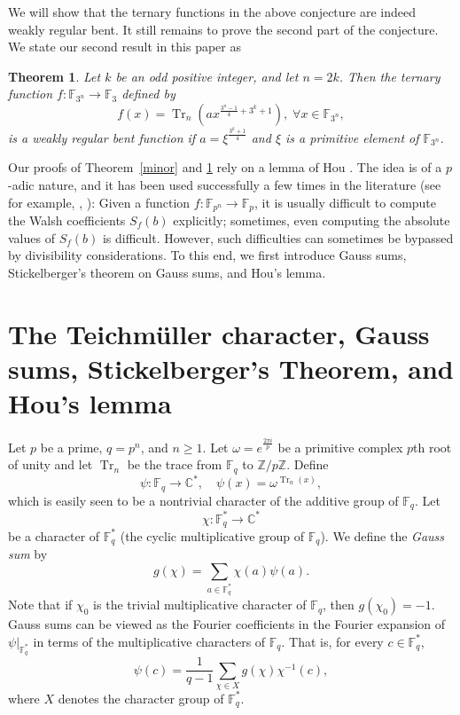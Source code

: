 \documentclass[11pt, reqno]{amsart}
\newtheorem{teor}{Theorem}[section]
\newcommand{\Ff}{{\mathbb F}}
\newcommand{\Zz}{{\mathbb Z}}
\newcommand{\Cc}{{\mathbb C}}
\def\Tr{\operatorname{Tr}}
\def\Tr{\operatorname{Tr}}
\begin{document}
We will show that the ternary functions in the above conjecture are
indeed weakly regular bent. It still remains to prove the second
part of the conjecture. We state our second result in this paper as

\begin{teor}\label{major}
Let $k$ be an odd positive integer, and let $n=2k$. Then the ternary
function $f:\Ff_{3^n}\rightarrow \Ff_3$ defined by
$$f(x)=\Tr_n(ax^{\frac{3^n-1}{4}+3^k+1}),\;\forall x\in \Ff_{3^n},$$
is a weakly regular bent function if $a=\xi^{\frac{3^k+1}{4}}$ and
$\xi$ is a primitive element of $\Ff_{3^n}$.
\end{teor}

Our proofs of Theorem~\ref{minor} and \ref{major} rely on a lemma of
Hou \cite{hou}. The idea is of a $p$-adic nature, and it has been
used successfully a few times in the literature (see for example,
\cite{hx}, \cite{dwx}): Given a function $f:\Ff_{p^n}\rightarrow
\Ff_p$, it is usually difficult to compute the Walsh coefficients
$S_f(b)$ explicitly; sometimes, even computing the absolute values
of $S_f(b)$ is difficult. However, such difficulties can sometimes
be bypassed by divisibility considerations. To this end, we first
introduce Gauss sums, Stickelberger's theorem on Gauss sums, and
Hou's lemma.

\section{The Teichm\"uller character, Gauss sums, Stickelberger's Theorem,
and Hou's lemma}\label{character}

Let $p$ be a prime, $q=p^n$, and $n\geq1$. Let $\omega=e^{\frac{2\pi
i}{p}}$ be a primitive complex $p$th root of unity and let $\Tr_n$
be the trace from $\Ff_q$ to $\Zz/p\Zz$. Define
$$ \psi: \Ff_q \rightarrow \Cc^*, \quad \psi(x)=\omega^{\Tr_n(x)},$$
which is easily seen to be a nontrivial character of the additive
group of $\Ff_q$. Let
$$\chi:\Ff_q^* \rightarrow \Cc^* $$
be a character of $\Ff_q^*$ (the cyclic multiplicative group of
$\Ff_q$). We define the {\it Gauss sum} by
$$ g(\chi)=\sum_{a \in \Ff_q^*} \chi(a)\psi(a).$$
Note that if $\chi_0$ is the trivial multiplicative character of
$\Ff_q$, then $g(\chi_0)=-1$. Gauss sums can be viewed as the
Fourier coefficients in the Fourier expansion of $\psi|_{\Ff_q^*}$
in terms of the multiplicative characters of
 $\Ff_q$. That is, for every $c\in \Ff_q^*$,
\begin{equation}\label{inv}
\psi(c)=\frac{1} {q-1}\sum_{\chi\in X}g(\chi)\chi^{-1}(c),
\end{equation}
where $X$ denotes the character group of $\Ff_q^*$.
\end{document}
